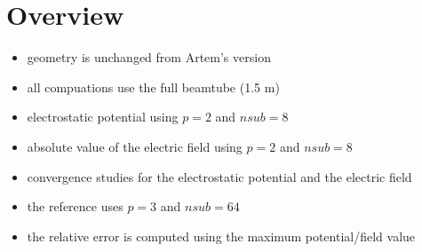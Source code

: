 \section{Overview}
\begin{itemize}
  \item geometry is unchanged from Artem's version
  \item all compuations use the full beamtube (1.5 m)
\end{itemize}

\begin{center}
\begin{figure}[ht]
  
\end{figure}
\end{center}

\begin{itemize}
  \item electrostatic potential using $p=2$ and $nsub=8$
\end{itemize}

\begin{center}
\begin{figure}[ht]
  
\end{figure}
\end{center}

\begin{itemize}
  \item absolute value of the electric field using $p=2$ and $nsub=8$
\end{itemize}

\begin{center}
\begin{figure}[ht]
  
\end{figure}
\end{center}

\begin{itemize}
  \item convergence studies for the electrostatic potential and the electric field
  \item the reference uses $p=3$ and $nsub=64$
  \item the relative error is computed using the maximum potential/field value
\end{itemize}

\begin{figure}[ht]
  \hspace{-2.5cm}
  
\end{figure}

